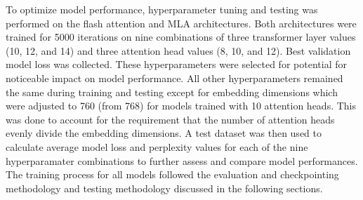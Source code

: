 To optimize model performance, hyperparameter tuning and testing was performed on the flash attention and MLA architectures. 
Both architectures were trained for 5000 iterations on nine combinations of three transformer layer values (10, 12, and 14) and three attention head values (8, 10, and 12). Best validation model loss was collected.
These hyperparameters were selected for potential for noticeable impact on model performance.
All other hyperparameters remained the same during training and testing except for embedding dimensions which were adjusted to 760 (from 768) for models trained with 10 attention heads. 
This was done to account for the requirement that the number of attention heads evenly divide the embedding dimensions. A test dataset was then used to calculate average model loss and perplexity values for each of the nine hyperparamater combinations to further assess and compare model performances.
The training process for all models followed the evaluation and checkpointing methodology and testing methodology discussed in the following sections. 

